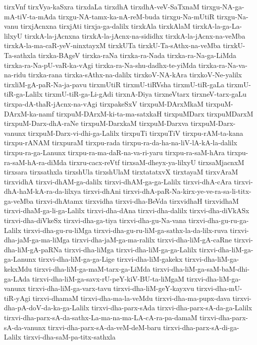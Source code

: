 {tirxVnf
tirxVya-kaSxra
tirxdaLa
tirxdhA
tirxdhA-veV-SaTxnaM
tirxgu-NA-ga-mA-tiV-ta-mAda
tirxgu-NA-tamx-ka-nA-reM-buda
tirxgu-Na-mUtiR
tirxgu-Na-vanu
tirxjAcnxna
tirxjAti
tirxja-ga-dalilx
tirxkAla
tirxkAlaM
tirxkA-la-ga-La-lilxyU
tirxkA-la-jAcnxna
tirxkA-la-jAcnx-na-sididhx
tirxkA-la-jAcnx-na-veMba
tirxkA-la-ma-caR-yeV-ninxtayxM
tirxkUTa
tirxkU-Ta-sAthx-na-veMba
tirxkU-Ta-sathxla
tirxka-BAgeV
tirxka-raNa
tirxka-ra-Nada
tirxka-ra-Na-ga-LiMda
tirxka-ra-Na-pU-vaR-ka-vAgi
tirxka-ra-Na-shu-dadhx-te-yiMda
tirxka-ra-Na-va-na-ridu
tirxka-rana
tirxka-sAthx-na-dalilx
tirxkoV-NA-kAra
tirxkoV-Ne-yalilx
tirxliM-gA-paR-Na-ja-pavu
tirxmUtiR
tirxmU-tiRVsha
tirxmU-tiR-gaLa
tirxmU-tiR-ga-Lalilx
tirxmU-tiR-ga-Li-gAdi
tirxnA-Diya
tirxneVtarx
tirxneV-tarx-gaLu
tirxpa-dA-thaR-jAcnx-na-vAgi
tirxpakeSxV
tirxpuM-DArxMkaM
tirxpuM-DArxM-ka-namf
tirxpuM-DArxM-ki-ta-ma-satxkaH
tirxpuMDarx
tirxpuMDarxM
tirxpuM-Darx-dhA-raNe
tirxpuM-DarxkaM
tirxpuM-Darxva
tirxpuM-Darx-vanunx
tirxpuM-Darx-vi-dhi-ga-Lalilx
tirxpuTi
tirxpuTiV
tirxpu-rAM-ta-kana
tirxpu-rANAM
tirxpuraM
tirxpu-rada
tirxpu-ra-da-ha-na-liV-lA-kA-la-dalilx
tirxpu-ra-ga-Lanunx
tirxpu-ra-ma-daR-na-va-ri-yaru
tirxpu-ra-saM-hAra
tirxpu-ra-saM-hA-ra-diMda
tirxru-cacx-reVtf
tirxsaM-dheyx-ya-lilxyU
tirxsaMjacnxM
tirxsara
tirxsathxla
tirxshUla
tirxshUlaM
tirxtatatxvX
tirxtayaM
tirxvAraM
tirxvidhA
tirxvi-dhAM-ga-dalilx
tirxvi-dhAM-ga-ga-Lalilx
tirxvi-dhA-cAra
tirxvi-dhA-haM-kA-ra-da-lilxya
tirxvi-dhAni
tirxvi-dhA-paR-Na-kirx-ye-ve-ra-sa-li-titx-ga-veMba
tirxvi-dhAtamx
tirxvidha
tirxvi-dha-BeVda
tirxvidhaH
tirxvidhaM
tirxvi-dhaM-ga-li-ga-Lalilx
tirxvi-dha-dAna
tirxvi-dha-dalilx
tirxvi-dha-diVkASx
tirxvi-dha-diVkeSx
tirxvi-dha-ga-tiya
tirxvi-dha-gu-Na-vana
tirxvi-dha-gu-ru-ga-Lalilx
tirxvi-dha-gu-ru-liMga
tirxvi-dha-gu-ru-liM-ga-sathx-la-da-lilx-ruva
tirxvi-dha-jaM-ga-ma-liMga
tirxvi-dha-jaM-ga-ma-ralilx
tirxvi-dha-liM-gA-caRne
tirxvi-dha-liM-gA-paRNa
tirxvi-dha-liMga
tirxvi-dha-liM-ga-ga-Lalilx
tirxvi-dha-liM-ga-ga-Lanunx
tirxvi-dha-liM-ga-ga-Lige
tirxvi-dha-liM-gakekx
tirxvi-dha-liM-ga-kekxMdu
tirxvi-dha-liM-ga-maM-tarx-ga-LiMda
tirxvi-dha-liM-ga-saM-baM-dhi-ga-LAda
tirxvi-dha-liM-ga-savx-rU-peY-kiV-BU-ta-liMgaM
tirxvi-dha-liM-ga-vanunx
tirxvi-dha-liM-ga-varx-tavu
tirxvi-dha-liM-geY-kayxvu
tirxvi-dha-mU-tiR-yAgi
tirxvi-dhamaM
tirxvi-dha-ma-la-veMdu
tirxvi-dha-ma-pupx-dava
tirxvi-dha-pA-doV-da-ka-ga-Lalilx
tirxvi-dha-parx-sAda
tirxvi-dha-parx-sA-da-ga-Lalilx
tirxvi-dha-parx-sA-da-sathx-La-ma-na-ma-LA-cA-ra-pa-damaM
tirxvi-dha-parx-sA-da-vanunx
tirxvi-dha-parx-sA-da-veM-deM-baru
tirxvi-dha-parx-sA-di-ga-Lalilx
tirxvi-dha-saM-pa-titx-sathxla
}
